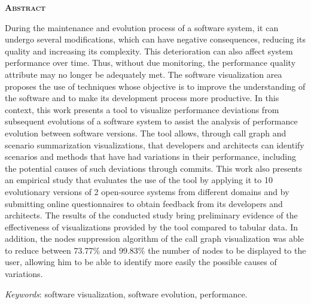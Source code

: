 \begin{center}
	{\Large{\textbf{\mscThesisEnglishTitle}}}
\end{center}

\vspace{1cm}


\vspace{1cm}

\begin{center}
	\Large{\textsc{\textbf{Abstract}}}
\end{center}

\noindent During the maintenance and evolution process of a software system, it can undergo several modifications, which can have negative consequences, reducing its quality and increasing its complexity. This deterioration can also affect system performance over time. Thus, without due monitoring, the performance quality attribute may no longer be adequately met. The software visualization area proposes the use of techniques whose objective is to improve the understanding of the software and to make its development process more productive. In this context, this work presents a tool to visualize performance deviations from subsequent evolutions of a software system to assist the analysis of performance evolution between software versions. The tool allows, through call graph and scenario summarization visualizations, that developers and architects can identify scenarios and methods that have had variations in their performance, including the potential causes of such deviations through commits. This work also presents an empirical study that evaluates the use of the tool by applying it to 10 evolutionary versions of 2 open-source systems from different domains and by submitting online questionnaires to obtain feedback from its developers and architects. The results of the conducted study bring preliminary evidence of the effectiveness of visualizations provided by the tool compared to tabular data. In addition, the nodes suppression algorithm of the call graph visualization was able to reduce between 73.77\% and 99.83\% the number of nodes to be displayed to the user, allowing him to be able to identify more easily the possible causes of variations.

\noindent\textit{Keywords}: software visualization, software evolution, performance.